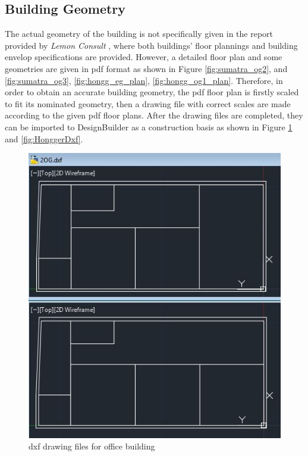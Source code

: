 \documentclass[a4paper, oneside]{discothesis}
\begin{document}
		\subsection{Building Geometry}
			The actual geometry of the building is not specifically given in the report provided by \textit{Lemon Consult} \cite{SIAPreviousreport}, where both buildings' floor plannings and building envelop specifications are provided. However, a detailed floor plan and some geometries are given in pdf format as shown in Figure \ref{fig:sumatra_og2}, and \ref{fig:sumatra_og3}, \ref{fig:hongg_eg_plan}, \ref{fig:hongg_og1_plan}. Therefore, in order to obtain an accurate building geometry, the pdf floor plan is firstly scaled to fit its nominated geometry, then a drawing file with correct scales are made according to the given pdf floor plans. After the drawing files are completed, they can be imported to DesignBuilder as a construction basis as shown in Figure \ref{fig:SumatraDxf} and \ref{fig:HonggerDxf}.

			\begin{figure}[H]
			\centering
			\includegraphics[scale=0.8]{Sumatra_dxf.jpg}
			\caption{dxf drawing files for office building}
			\label{fig:SumatraDxf}
			\end{figure}
			
\end{document}
